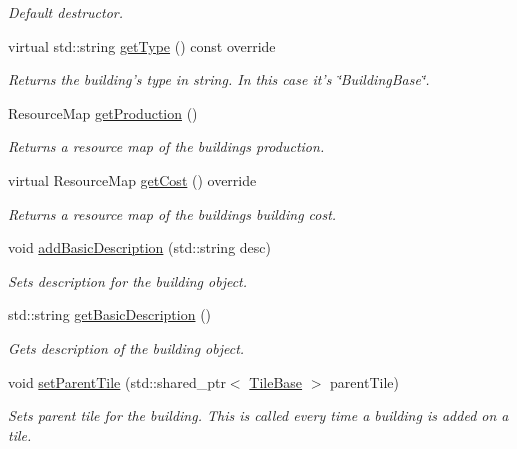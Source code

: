 \begin{DoxyCompactItemize}
\begin{DoxyCompactList}\small\item\em Default destructor. \end{DoxyCompactList}\item 
virtual std\-::string \hyperlink{class_course_1_1_building_base_ac2cc44e08dc73d05b1617bf71295baaf}{get\-Type} () const override
\begin{DoxyCompactList}\small\item\em Returns the building's type in string. In this case it's \char`\"{}\-Building\-Base\char`\"{}. \end{DoxyCompactList}\item 
Resource\-Map \hyperlink{class_course_1_1_building_base_ad53ecc1dea91e3ca51c31759fe1680cb}{get\-Production} ()
\begin{DoxyCompactList}\small\item\em Returns a resource map of the buildings production. \end{DoxyCompactList}\item 
virtual Resource\-Map \hyperlink{class_course_1_1_building_base_a7af046114519803867ed3a445c265991}{get\-Cost} () override
\begin{DoxyCompactList}\small\item\em Returns a resource map of the buildings building cost. \end{DoxyCompactList}\item 
void \hyperlink{class_course_1_1_building_base_a2f4c7eab18e5c1b9b3c6f04d5c00a743}{add\-Basic\-Description} (std\-::string desc)
\begin{DoxyCompactList}\small\item\em Sets description for the building object. \end{DoxyCompactList}\item 
std\-::string \hyperlink{class_course_1_1_building_base_a80c4b2f5b6b3c5e41e17297d28bf0c4c}{get\-Basic\-Description} ()
\begin{DoxyCompactList}\small\item\em Gets description of the building object. \end{DoxyCompactList}\item 
void \hyperlink{class_course_1_1_building_base_a335ff3d5e278f9f1f0c6735bd5e4c703}{set\-Parent\-Tile} (std\-::shared\-\_\-ptr$<$ \hyperlink{class_course_1_1_tile_base}{Tile\-Base} $>$ parent\-Tile)
\begin{DoxyCompactList}\small\item\em Sets parent tile for the building. This is called every time a building is added on a tile. \end{DoxyCompactList}\end{DoxyCompactItemize}
